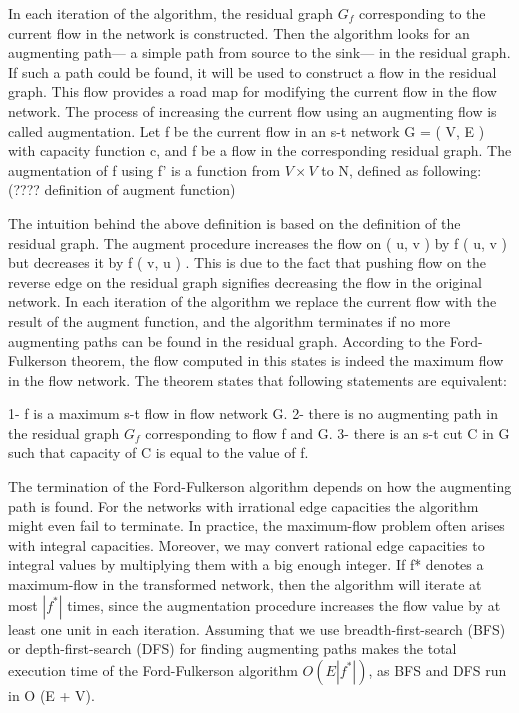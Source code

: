 \documentclass{llncs}
\begin{document}
In each iteration of the algorithm, the residual graph $G_f$ corresponding to the current flow in the network is constructed. Then the algorithm looks for an augmenting path--- a simple path from source to the sink--- in the residual graph. If such a path could be found, it will be used to construct a flow in the residual graph. This flow provides a road map for modifying the current flow in the flow network. The process of increasing the current flow using an augmenting flow is called augmentation. Let f be the current flow in an s-t network G = ( V, E ) with capacity function c, and f be a flow in the corresponding residual graph. The augmentation of f using f' is a function from $V \times V$ to N, defined as following:
(???? definition of augment function)

The intuition behind the above definition is based on the definition of the residual graph. The augment procedure increases the flow on ( u, v ) by f ( u, v ) but decreases it
by f ( v, u ) . This is due to the fact that pushing flow on the reverse edge on the residual graph signifies decreasing the flow in the original network. In each iteration of the algorithm we replace the current flow with the result of the augment function, and the algorithm terminates if no more augmenting paths can be found in the residual graph. According to the Ford-Fulkerson theorem, the flow computed in this states is indeed the maximum flow in the flow network. The theorem states that following statements are equivalent:

1- f is a maximum s-t flow in flow network G.
2- there is no augmenting path in the residual graph $G_f$ corresponding to flow f and G.
3- there is an s-t cut C in G such that capacity of C is equal to the value of f.

The termination of the Ford-Fulkerson algorithm depends on how the augmenting path is found. For the networks with irrational edge capacities the algorithm might even fail to terminate. In practice, the maximum-flow problem often arises with integral capacities. Moreover, we may convert rational edge capacities to integral values by multiplying them with a big enough integer. If f* denotes a maximum-flow in the transformed network, then the algorithm will iterate at most $|f^*|$ times, since the augmentation procedure increases the flow value by at least one unit in each iteration. Assuming that we use breadth-first-search (BFS) or depth-first-search (DFS) for finding augmenting paths makes the total execution time of the Ford-Fulkerson algorithm $O ( E | f^* |)$, as BFS and DFS run in O (E + V).
\end{document}
